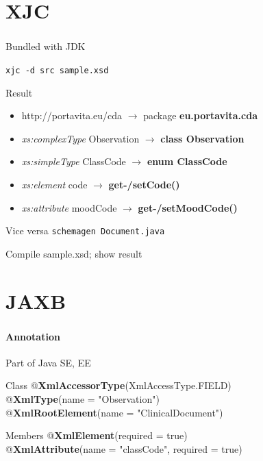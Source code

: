\documentclass[handout]{beamer}
\begin{document}
\section{XJC}
\begin{frame}
	\frametitle{\insertsection}
	Bundled with JDK \\
	\begin{example}
		\texttt{xjc -d src sample.xsd}
	\end{example}
	\begin{block}{Result}
		\begin{itemize}
			\item http://portavita.eu/cda $\rightarrow$ package \textbf{eu.portavita.cda} \\
			\item \emph{xs:complexType} Observation $\rightarrow$ \textbf{class Observation} \\
			\item \emph{xs:simpleType} ClassCode $\rightarrow$ \textbf{enum ClassCode} \\
			\item \emph{xs:element} code $\rightarrow$ \textbf{get-/setCode()} \\
			\item \emph{xs:attribute} moodCode $\rightarrow$ \textbf{get-/setMoodCode()} \\
		\end{itemize}
	\end{block}
	\begin{block}{Vice versa}
		\texttt{schemagen Document.java}
	\end{block}
	\begin{semiverbatim}
		Compile sample.xsd; show result
	\end{semiverbatim}
\end{frame}

\section{JAXB}
\begin{frame}
	\frametitle{\insertsection}
	\framesubtitle{Annotation}
	Part of Java SE, EE
	\begin{block}{Class}
		@\textbf{XmlAccessorType}(XmlAccessType.FIELD) \\
		@\textbf{XmlType}(name = "Observation") \\
		@\textbf{XmlRootElement}(name = "ClinicalDocument") \\
	\end{block}
	\begin{block}{Members}
		@\textbf{XmlElement}(required = true) \\
		@\textbf{XmlAttribute}(name = "classCode", required = true) \\
	\end{block}
\end{frame}
\end{document}

